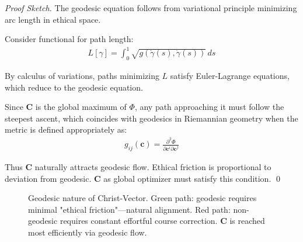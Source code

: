 \documentclass[11pt,a4paper]{article}
\theoremstyle{definition}
\theoremstyle{remark}
\newcommand{\cc}{\mathbf{c}}
\begin{document}
\begin{proof}[Proof Sketch]
The geodesic equation follows from variational principle minimizing arc length in ethical space. 

Consider functional for path length:
\begin{align}
L[\gamma] = \int_0^1 \sqrt{g(\dot{\gamma}(s), \dot{\gamma}(s))} \, ds
\end{align}

By calculus of variations, paths minimizing \(L\) satisfy Euler-Lagrange equations, which reduce to the geodesic equation. 

Since \(\mathbf{C}\) is the global maximum of \(\Phi\), any path approaching it must follow the steepest ascent, which coincides with geodesics in Riemannian geometry when the metric is defined appropriately as:
\begin{align}
g_{ij}(\cc) = \frac{\partial^2 \Phi}{\partial \cc^i \partial \cc^j}
\end{align}

Thus \(\mathbf{C}\) naturally attracts geodesic flow. Ethical friction is proportional to deviation from geodesic. \(\mathbf{C}\) as global optimizer must satisfy this condition. \qed
\end{proof}

\begin{figure}[H]
\centering
{}
\caption{Geodesic nature of Christ-Vector. Green path: geodesic requires minimal "ethical friction"—natural alignment. Red path: non-geodesic requires constant effortful course correction. \(\mathbf{C}\) is reached most efficiently via geodesic flow.}
\label{fig:geodesic_flow}
\end{figure}
\end{document}
